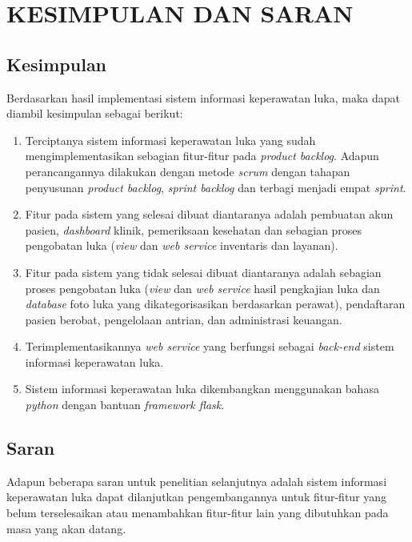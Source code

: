 
\chapter{KESIMPULAN DAN SARAN}

\section{Kesimpulan}

Berdasarkan hasil implementasi sistem informasi keperawatan luka, maka dapat diambil kesimpulan sebagai berikut:

\begin{enumerate}
	\item Terciptanya sistem informasi keperawatan luka yang sudah mengimplementasikan sebagian fitur-fitur pada \emph{product backlog}. Adapun perancangannya dilakukan dengan metode \emph{scrum} dengan tahapan penyusunan \emph{product backlog}, \emph{sprint backlog} dan terbagi menjadi empat \emph{sprint}.
	\item Fitur pada sistem yang selesai dibuat diantaranya adalah pembuatan akun pasien, \emph{dashboard} klinik, pemeriksaan kesehatan dan sebagian proses pengobatan luka (\emph{view} dan \emph{web service} inventaris dan layanan).
	\item Fitur pada sistem yang tidak selesai dibuat diantaranya adalah sebagian proses pengobatan luka (\emph{view} dan \emph{web service} hasil pengkajian luka dan \emph{database} foto luka yang dikategorisasikan berdasarkan perawat), pendaftaran pasien berobat, pengelolaan antrian, dan administrasi keuangan.
	\item Terimplementasikannya \emph{web service} yang berfungsi sebagai \emph{back-end} sistem informasi keperawatan luka.
	\item Sistem informasi keperawatan luka dikembangkan menggunakan bahasa \emph{python} dengan bantuan \emph{framework flask}.  
\end{enumerate}

\section{Saran}

Adapun beberapa saran untuk penelitian selanjutnya adalah sistem informasi keperawatan luka dapat dilanjutkan pengembangannya untuk fitur-fitur yang belum terselesaikan atau menambahkan fitur-fitur lain yang dibutuhkan pada masa yang akan datang.

\begin{comment}

\end{comment}